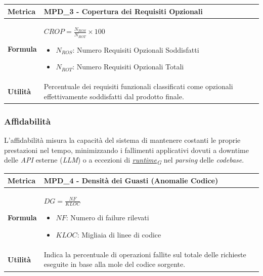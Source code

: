 \documentclass[12pt, a4paper]{article}
\newcommand{\urlglossario}{https://skynetunigroup.github.io/Code_Guardian/Documentazione/RTB/glossario_v1.0.0.pdf} %
\newcommand{\glo}[2]{\href{\urlglossario\#nameddest=#2}{#1\textsubscript{G}}}
\begin{document}
\begin{table}[H]
\centering
\renewcommand{\arraystretch}{1.5}
\begin{tabular}{|l|p{12cm}|}
\hline
\textbf{Metrica} & MPD\_3 - Copertura dei Requisiti Opzionali \\ \hline
\textbf{Formula} & $CROP = \frac{N_{ROS}}{N_{ROT}} \times 100$
\begin{itemize}
    \item $N_{ROS}$: Numero Requisiti Opzionali Soddisfatti
    \item $N_{ROT}$: Numero Requisiti Opzionali Totali
\end{itemize} \\ \hline
\textbf{Utilità} & Percentuale dei requisiti funzionali classificati come opzionali effettivamente soddisfatti dal prodotto finale. \\ \hline
\end{tabular}
\end{table}


\subsubsection{Affidabilità}
L'affidabilità misura la capacità del sistema di mantenere costanti le proprie prestazioni nel tempo, minimizzando i fallimenti applicativi dovuti a downtime delle \textit{API} esterne (\textit{LLM}) o a eccezioni di \textit{\glo{runtime}{runtime}} nel \textit{parsing} delle \textit{codebase}.

\begin{table}[H]
\centering
\renewcommand{\arraystretch}{1.5}
\begin{tabular}{|l|p{12cm}|}
\hline
\textbf{Metrica} & MPD\_4 - Densità dei Guasti (Anomalie Codice) \\ \hline
\textbf{Formula} & $DG = \frac{NF}{KLOC}$
\begin{itemize}
    \item $NF$: Numero di failure rilevati
    \item $KLOC$: Migliaia di linee di codice 
\end{itemize} \\ \hline
\textbf{Utilità} & Indica la percentuale di operazioni fallite sul totale delle richieste eseguite in base alla mole del codice sorgente. \\ \hline
\end{tabular}
\end{table}
\end{document}
